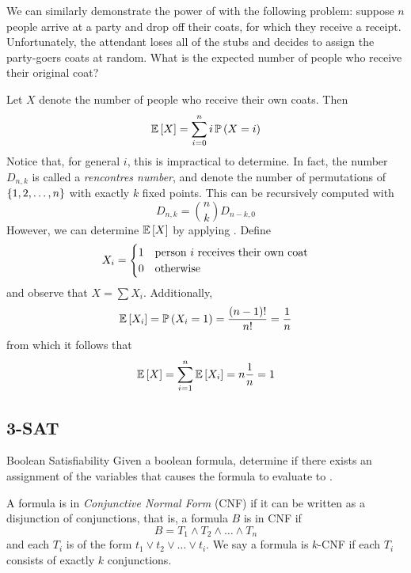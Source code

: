 We can similarly demonstrate the power of  with the
following problem: suppose $n$ people arrive at a party and drop off their
coats, for which they receive a receipt. Unfortunately, the attendant loses all
of the stubs and decides to assign the party-goers coats at random. What is the
expected number of people who receive their original coat?

Let $X$ denote the number of people who receive their own coats. Then
\[\operatorname{\mathbb{E}}\left[X\right] = \sum_{i=0}^n i \operatorname{\mathbb{P}}\left(X = i\right)\]
Notice that, for general $i$, this is impractical to determine. In fact, the
number $D_{n, k}$ is called a \emph{rencontres number}, and denote the number of
permutations of $\left\lbrace1, 2, \dots, n\right\rbrace$ with exactly $k$ fixed points. This can
be recursively computed with
\[D_{n, k} = \binom{n}{k}D_{n-k,0}\]
However, we can determine $\operatorname{\mathbb{E}}\left[X\right]$ by applying .
Define
\[X_i = \begin{cases}1 & \hbox{person $i$ receives their own coat}\\
    0 & \hbox{otherwise}\end{cases}\]
and observe that $X = \sum X_i$. Additionally,
\[\operatorname{\mathbb{E}}\left[X_i\right] = \operatorname{\mathbb{P}}\left(X_i = 1\right) = \frac{(n - 1)!}{n!} = \frac{1}{n}\]
from which it follows that
\[\operatorname{\mathbb{E}}\left[X\right] = \sum_{i=1}^n \operatorname{\mathbb{E}}\left[X_i\right] = n\frac{1}{n}=1\]

\subsection{3-SAT}
\begin{problem}{Boolean Satisfiability}{}
    Given a boolean formula, determine if there exists an assignment of the
    variables that causes the formula to evaluate to \True.
\end{problem}
A formula is in \emph{Conjunctive Normal Form} (CNF) if it can be written as a
disjunction of conjunctions, that is, a formula $B$ is in CNF if
\[B = T_1 \land T_2 \land \dots \land T_n\]
and each $T_i$ is of the form $t_1 \lor t_2 \lor \dots \lor t_i$. We say a
formula is $k$-CNF if each $T_i$ consists of exactly $k$ conjunctions. 

